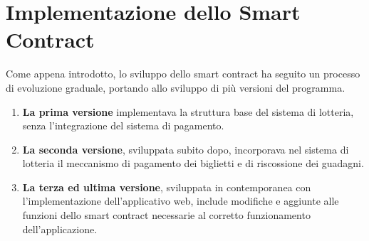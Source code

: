 \documentclass[12pt,a4paper,openright,twoside]{report}
\begin{document}
\section{Implementazione dello Smart Contract}
Come appena introdotto, lo sviluppo dello smart contract ha seguito un processo di evoluzione graduale, portando allo sviluppo di più versioni del programma.
\begin{enumerate}[font=\bfseries]
    \item \textbf{La prima versione} implementava la struttura base del sistema di lotteria, senza l'integrazione del sistema di pagamento.
    \item \textbf{La seconda versione}, sviluppata subito dopo, incorporava nel sistema di lotteria il meccanismo di pagamento dei biglietti e di riscossione dei guadagni.
    \item \textbf{La terza ed ultima versione}, sviluppata in contemporanea con l'implementazione dell'applicativo web, include modifiche e aggiunte alle funzioni dello smart contract necessarie al corretto funzionamento dell'applicazione.
\end{enumerate}
\end{document}
